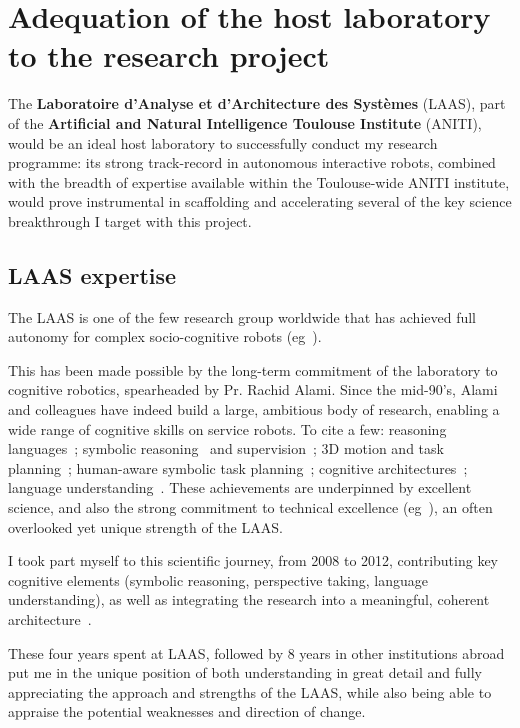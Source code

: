 \section{Adequation of the host laboratory to the research project}

The \textbf{Laboratoire d'Analyse et d'Architecture des Systèmes} (LAAS), part
of the \textbf{Artificial and Natural Intelligence Toulouse Institute} (ANITI), would
be an ideal host laboratory to successfully conduct my research programme: its
strong track-record in autonomous interactive robots, combined with the breadth
of expertise available within the Toulouse-wide ANITI institute, would prove
instrumental in scaffolding and accelerating several of the key science
breakthrough I target with this project.

\subsection{LAAS expertise}

The LAAS is one of the few research group worldwide that has achieved full
autonomy for complex socio-cognitive robots (eg~\cite{lemaignan2017artificial}).

This has been made possible by the long-term commitment of the laboratory to
cognitive robotics, spearheaded by Pr. Rachid Alami. Since the mid-90's, Alami
and colleagues have indeed build a large, ambitious body of research, enabling a
wide range of cognitive skills on service robots. To cite a few: reasoning
languages~\autocite{Ingrand1996}; symbolic
reasoning~\autocite{lemaignan2010oro} and supervision~\autocite{Clodic2009}; 3D motion
and task planning~\autocite{Sisbot2008, Mainprice2011}; human-aware symbolic task
planning~\autocite{Alili2008,Lallement2014,milliez2016using}; cognitive
architectures~\autocite{lemaignan2017artificial,devin2016implemented}; language
understanding~\autocite{lemaignan2011grounding}.
These achievements are underpinned by excellent science, and also the strong
commitment to technical excellence (eg~\textcite{mallet2010genom3}), an often
overlooked yet unique strength of the LAAS.


I took part myself to this scientific journey, from 2008 to 2012, contributing
key cognitive elements (symbolic reasoning, perspective taking, language
understanding), as well as integrating the research into a meaningful, coherent
architecture~\autocite{lemaignan2017artificial}.

These four years spent at LAAS,
followed by 8 years in other institutions abroad put me in the unique position
of both understanding in great detail and fully appreciating the approach and
strengths of the LAAS, while also being able to appraise the potential
weaknesses and direction of change.

